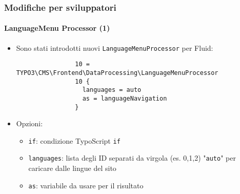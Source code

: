 \begin{frame}[fragile]
	\frametitle{Modifiche per sviluppatori}
	\framesubtitle{LanguageMenu Processor (1)}

	\lstset{basicstyle=\tiny\ttfamily}

	\begin{itemize}
		\item Sono stati introdotti nuovi \texttt{LanguageMenuProcessor} per Fluid:

			\begin{lstlisting}
				10 = TYPO3\CMS\Frontend\DataProcessing\LanguageMenuProcessor
				10 {
				  languages = auto
				  as = languageNavigation
				}
			\end{lstlisting}

		\item Opzioni:

			\begin{itemize}

				\item \texttt{if}: condizione TypoScript \texttt{if}
				\item \texttt{languages}: lista degli ID separati da virgola 
					(es. 0,1,2) "\texttt{auto}" per caricare dalle lingue del sito
				\item \texttt{as}: variabile da usare per il risultato
			\end{itemize}

	\end{itemize}

\end{frame}


